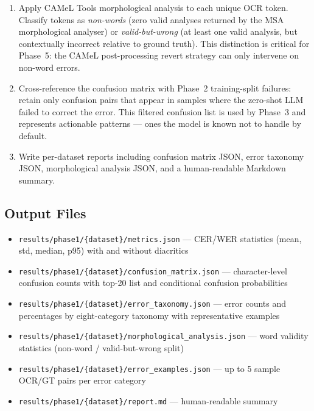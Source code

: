 \begin{enumerate}
  \item Apply CAMeL Tools morphological analysis to each unique OCR token.
        Classify tokens as \emph{non-words} (zero valid analyses returned by
        the MSA morphological analyser) or \emph{valid-but-wrong} (at least
        one valid analysis, but contextually incorrect relative to ground
        truth). This distinction is critical for Phase~5: the CAMeL
        post-processing revert strategy can only intervene on non-word errors.

  \item Cross-reference the confusion matrix with Phase~2 training-split
        failures: retain only confusion pairs that appear in samples where
        the zero-shot LLM failed to correct the error. This filtered confusion
        list is used by Phase~3 and represents actionable patterns --- ones
        the model is known not to handle by default.

  \item Write per-dataset reports including confusion matrix JSON, error
        taxonomy JSON, morphological analysis JSON, and a human-readable
        Markdown summary.
\end{enumerate}

\subsection{Output Files}
\label{subsec:phase1_outputs}
\begin{itemize}
  \item \texttt{results/phase1/\{dataset\}/metrics.json} --- CER/WER statistics
        (mean, std, median, p95) with and without diacritics
  \item \texttt{results/phase1/\{dataset\}/confusion\_matrix.json} --- character-level
        confusion counts with top-20 list and conditional confusion probabilities
  \item \texttt{results/phase1/\{dataset\}/error\_taxonomy.json} --- error counts
        and percentages by eight-category taxonomy with representative examples
  \item \texttt{results/phase1/\{dataset\}/morphological\_analysis.json} --- word
        validity statistics (non-word / valid-but-wrong split)
  \item \texttt{results/phase1/\{dataset\}/error\_examples.json} --- up to 5 sample
        OCR/GT pairs per error category
  \item \texttt{results/phase1/\{dataset\}/report.md} --- human-readable summary
\end{itemize}


